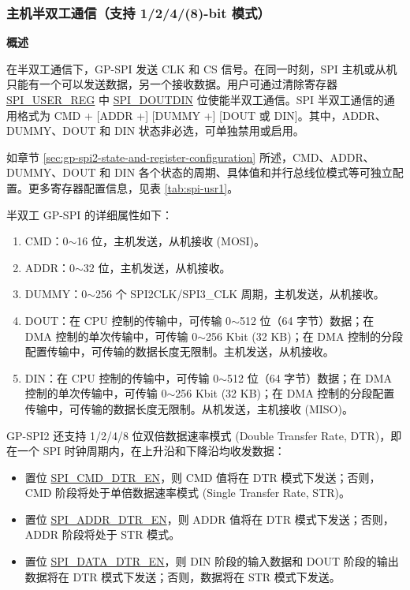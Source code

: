\documentclass[main\_\_CN.tex]{subfiles}
\begin{document}
\subsubsection{主机半双工通信（支持 1/2/4/(8)-bit 模式）}
\label{sec:gp-spi2-1/2/8-bits}

\textbf{概述}

在半双工通信下，GP-SPI 发送 CLK 和 CS 信号。在同一时刻，SPI 主机或从机只能有一个可以发送数据，另一个接收数据。用户可通过清除寄存器 \hyperref[regdesc:SPIUSERREG]{SPI\_USER\_REG} 中 \hyperref[fielddesc:SPIDOUTDIN]{SPI\_DOUTDIN} 位使能半双工通信。SPI 半双工通信的通用格式为 CMD + [ADDR +] [DUMMY +] [DOUT 或 DIN]。其中，ADDR、DUMMY、DOUT 和 DIN 状态非必选，可单独禁用或启用。

如章节 \ref{sec:gp-spi2-state-and-register-configuration} 所述，CMD、ADDR、DUMMY、DOUT 和 DIN 各个状态的周期、具体值和并行总线位模式等可独立配置。更多寄存器配置信息，见表 \ref{tab:spi-usr1}。

半双工 GP-SPI 的详细属性如下：

\begin{enumerate}
    \item CMD：0$\sim$16 位，主机发送，从机接收 (MOSI)。
    \item ADDR：0$\sim$32 位，主机发送，从机接收。
    \item DUMMY：0$\sim$256 个 SPI2CLK/SPI3\_CLK 周期，主机发送，从机接收。
    \item DOUT：在 CPU 控制的传输中，可传输 0$\sim$512 位（64 字节）数据；在 DMA 控制的单次传输中，可传输 0$\sim$256 Kbit (32 KB)；在 DMA 控制的分段配置传输中，可传输的数据长度无限制。主机发送，从机接收。
    \item DIN：在 CPU 控制的传输中，可传输 0$\sim$512 位（64 字节）数据；在 DMA 控制的单次传输中，可传输 0$\sim$256 Kbit (32 KB)；在 DMA 控制的分段配置传输中，可传输的数据长度无限制。从机发送，主机接收 (MISO)。
\end{enumerate}

GP-SPI2 还支持 1/2/4/8 位双倍数据速率模式 (Double Transfer Rate, DTR)，即在一个 SPI 时钟周期内，在上升沿和下降沿均收发数据：

\begin{itemize}
\item 置位 \hyperlink{fielddesc:SPICMDDTREN}{SPI\_CMD\_DTR\_EN}，则 CMD 值将在 DTR 模式下发送；否则，CMD 阶段将处于单倍数据速率模式 (Single Transfer Rate, STR)。
\item 置位 \hyperlink{fielddesc:SPIADDRDTREN}{SPI\_ADDR\_DTR\_EN}，则 ADDR 值将在 DTR 模式下发送；否则，ADDR 阶段将处于 STR 模式。
\item 置位 \hyperlink{fielddesc:SPIDATADTREN}{SPI\_DATA\_DTR\_EN}，则 DIN 阶段的输入数据和 DOUT 阶段的输出数据将在 DTR 模式下发送；否则，数据将在 STR 模式下发送。
\end{itemize}
\end{document}
